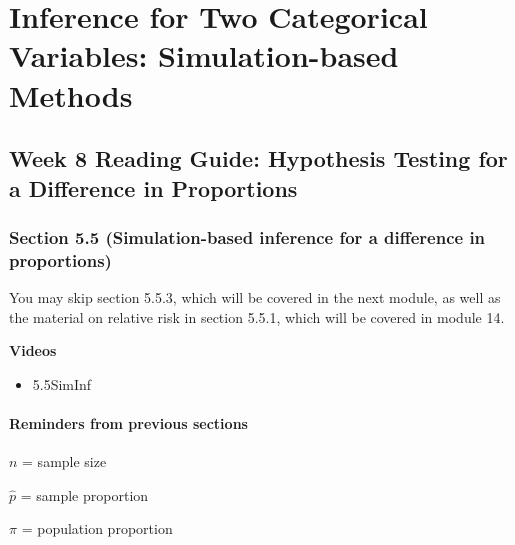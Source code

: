 \documentclass[
]{report}
\providecommand{\tightlist}{%
  \setlength{\itemsep}{0pt}\setlength{\parskip}{0pt}}
\begin{document}
\newpage

\hypertarget{inference-for-two-categorical-variables-simulation-based-methods}{%
\chapter{Inference for Two Categorical Variables: Simulation-based Methods}\label{inference-for-two-categorical-variables-simulation-based-methods}}

\hypertarget{week-8-reading-guide-hypothesis-testing-for-a-difference-in-proportions}{%
\section{Week 8 Reading Guide: Hypothesis Testing for a Difference in Proportions}\label{week-8-reading-guide-hypothesis-testing-for-a-difference-in-proportions}}

\hypertarget{section-5.5-simulation-based-inference-for-a-difference-in-proportions}{%
\subsection*{Section 5.5 (Simulation-based inference for a difference in proportions)}\label{section-5.5-simulation-based-inference-for-a-difference-in-proportions}}

You may skip section 5.5.3, which will be covered in the next module, as well as the material on relative risk in section 5.5.1, which will be covered in module 14.

\textbf{Videos}

\begin{itemize}
\tightlist
\item
  5.5SimInf
\end{itemize}


\hypertarget{reminders-from-previous-sections-3}{%
\subsubsection*{Reminders from previous sections}\label{reminders-from-previous-sections-3}}

\(n\) = sample size

\(\hat{p}\) = sample proportion

\(\pi\) = population proportion
\end{document}
